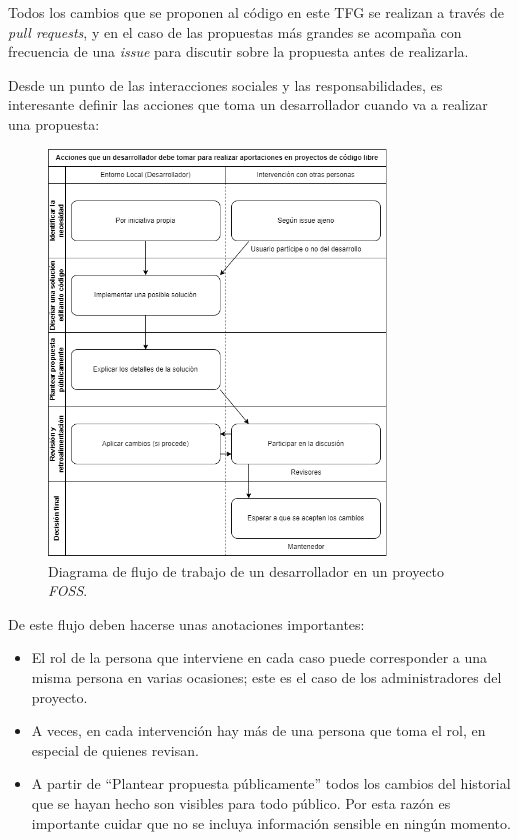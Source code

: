 Todos los cambios que se proponen al código en este TFG se realizan a través de \textit{pull requests}, y en el caso de las propuestas más grandes se acompaña con frecuencia de una \textit{issue} para discutir sobre la propuesta antes de realizarla.

Desde un punto de las interacciones sociales y las responsabilidades, es interesante definir las acciones que toma un desarrollador cuando va a realizar una propuesta:

\begin{figure}[H]
    \centering
    \includegraphics[width=0.8\textwidth]{images/SoA_foss/Contrib_dev.png}
    \caption{Diagrama de flujo de trabajo de un desarrollador en un proyecto \textit{FOSS}.}
    \label{fig:FOSS_workflow}
\end{figure}

De este flujo deben hacerse unas anotaciones importantes:

\begin{itemize}
    \item El rol de la persona que interviene en cada caso puede corresponder a una misma persona en varias ocasiones; este es el caso de los administradores del proyecto.
    \item A veces, en cada intervención hay más de una persona que toma el rol, en especial de quienes revisan.
    \item A partir de ``Plantear propuesta públicamente'' todos los cambios del historial que se hayan hecho son visibles para todo público. Por esta razón es importante cuidar que no se incluya información sensible en ningún momento.
\end{itemize}

